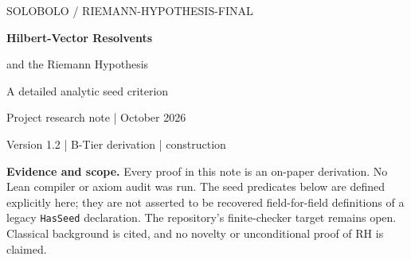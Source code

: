 \documentclass[11pt,a4paper]{article}
\numberwithin{equation}{section}
\theoremstyle{definition}
\theoremstyle{remark}
\begin{document}
\begin{center}
{\small\sffamily\color{linkblue} SOLOBOLO \enspace / \enspace RIEMANN-HYPOTHESIS-FINAL}\par
\vspace{9pt}
{\LARGE\bfseries\color{ink} Hilbert-Vector Resolvents\par
and the Riemann Hypothesis}\par
\vspace{7pt}
{\large A detailed analytic seed criterion}\par
\vspace{9pt}
{\small Project research note \enspace |  October 2026}\par
{\small Version 1.2 \enspace | \enspace B-Tier derivation \enspace | \enspace construction}
\end{center}
\vspace{5pt}
\begin{abstract}
We derive an analytic Hilbert-vector criterion for the Riemann hypothesis.
For the entire function $\Theta(w^2)=\xi(\tfrac12+w)$, put
$L=\Theta'/\Theta$. RH is equivalent to one bounded nonnegative
self-adjoint operator $K$ and one fixed vector $v$ satisfying
$(aL(a))'=\|(I+aK)^{-1}v\|^2$ on a positive interval.
We prove the resolvent identities, remove the integration constant,
and transfer exact calibration to the actual zero geometry.
The converse uses the zero product under RH, with multiplicities retained.
Hyperbolic zeta identities supply positive comparison models and exact
actual-$\xi$ coefficients. A canonical Jensen-polynomial construction
then has an unconditional entire limit, with an explicit error bound;
its real-rootedness at unbounded degrees is equivalent to RH.
We derive the exact next-degree critical-value condition, a finite
Hermite-matrix test, canonical Bernstein grid seeds, and the Schur
intervals for extending actual moments. We also classify possible limits
of the original squared pencils. These results isolate the required
all-order positivity theorem; they do not prove it. The classical
criteria are attributed, the finite-checker endpoint remains open,
and no native Lean compilation or axiom audit is claimed.
\end{abstract}
\begin{scopebox}
\small\textbf{Evidence and scope.} Every proof in this note is an on-paper
derivation. No Lean compiler or axiom audit was run. The seed predicates
below are defined explicitly here; they are not asserted to be recovered
field-for-field definitions of a legacy \texttt{HasSeed} declaration.
The repository's finite-checker target remains open. Classical background
is cited, and no novelty or unconditional proof of RH is claimed.
\end{scopebox}
\vspace{5pt}
\end{document}

